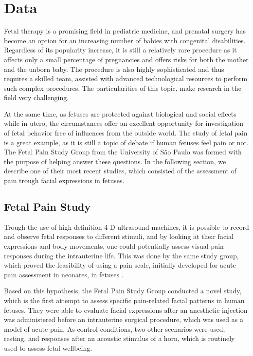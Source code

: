 \chapter{Data}

Fetal therapy is a promising field in pediatric medicine, and prenatal surgery has become an option for an increasing number of babies with congenital disabilities. Regardless of its popularity increase, it is still a relatively rare procedure as it affects only a small percentage of pregnancies and offers risks for both the mother and the unborn baby. The procedure is also highly sophisticated and thus requires a skilled team, assisted with advanced technological resources to perform such complex procedures. The particularities of this topic, make research in the field very challenging.

At the same time, as fetuses are protected against biological and social effects while in utero, the circumstances offer an excellent opportunity for investigation of fetal behavior free of influences from the outside world. The study of fetal pain is a great example, as it is still a topic of debate if human fetuses feel pain or not. The Fetal Pain Study Group from the University of São Paulo was formed with the purpose of helping answer these questions. In the following section, we describe one of their most recent studies, which consisted of the assessment of pain trough facial expressions in fetuses.

\section{Fetal Pain Study}

Trough the use of high definition 4-D ultrasound machines, it is possible to record and observe fetal responses to different stimuli, and by looking at their facial expressions and body movements, one could potentially assess visual pain responses during the intrauterine life. This was done by the same study group, which proved the feasibility of using a pain scale, initially developed for acute pain assessment in neonates, in fetuses \citep{bernardes2018feasibility}. 

Based on this hypothesis, the Fetal Pain Study Group conducted a novel study, which is the first attempt to assess specific pain-related facial patterns in human fetuses. They were able to evaluate facial expressions after an anesthetic injection was administered before an intrauterine surgical procedure, which was used as a model of acute pain. As control conditions, two other scenarios were used, resting, and responses after an acoustic stimulus of a horn, which is routinely used to assess fetal wellbeing.

